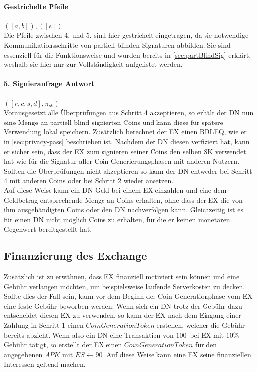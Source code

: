 \documentclass[
	fontsize=11pt,
	headings=small,
	parskip=half,           %
	bibliography=totoc,
	numbers=noenddot,       %
	open=any,               %
]{scrreprt}
\begin{document}
\paragraph*{Gestrichelte Pfeile} $([a,b]), ([e])$\\
Die Pfeile zwischen 4. und 5. sind hier gestrichelt eingetragen, da sie notwendige Kommunikationsschritte von partiell blinden Signaturen abbilden. Sie sind essenziell für die Funktionsweise und wurden bereits in \ref{sec:partBlindSig} erklärt, weshalb sie hier nur zur Vollständigkeit aufgelistet werden.

\paragraph{5. Signieranfrage Antwort} $([r,c,s,d], \pi_{sk})$ \\
Vorausgesetzt alle Überprüfungen aus Schritt 4 akzeptieren, so erhält der DN nun eine Menge an partiell blind signierten Coins und kann diese für spätere Verwendung lokal speichern. Zusätzlich berechnet der EX einen BDLEQ, wie er in \ref{sec:privacy-pass} beschrieben ist. Nachdem der DN diesen verfiziert hat, kann er sicher sein, dass der EX zum signieren seiner Coins den selben SK verwendet hat wie für die Signatur aller Coin Generierungsphasen mit anderen Nutzern. Sollten die Überprüfungen nicht akzeptieren so kann der DN entweder bei Schritt 4 mit anderen Coins oder bei Schritt 2 wieder ansetzen.\\

Auf diese Weise kann ein DN Geld bei einem EX einzahlen und eine dem Geldbetrag entsprechende Menge an Coins erhalten, ohne dass der EX die von ihm ausgehändigten Coins oder den DN nachverfolgen kann. Gleichzeitig ist es für einen DN nicht möglich Coins zu erhalten, für die er keinen monetären Gegenwert bereitgestellt hat.
\subsection{Finanzierung des Exchange}
Zusätzlich ist zu erwähnen, dass EX finanziell motiviert sein können und eine Gebühr verlangen möchten, um beispielsweise laufende Serverkosten zu decken. Sollte dies der Fall sein, kann vor dem Beginn der Coin Generationphase vom EX eine feste Gebühr beworben werden. Wenn sich ein DN trotz der Gebühr dazu entscheidet diesen EX zu verwenden, so kann der EX nach dem Eingang einer Zahlung in Schritt 1 einen $CoinGenerationToken$ erstellen, welcher die Gebühr bereits abzieht. Wenn also ein DN eine Transaktion von $100$\texteuro\ bei EX mit $10\%$ Gebühr tätigt, so erstellt der EX einen $CoinGenerationToken$ für den angegebenen $APK$ mit $ES \leftarrow 90$\texteuro. Auf diese Weise kann eine EX seine finanziellen Interessen geltend machen. 
\end{document}
